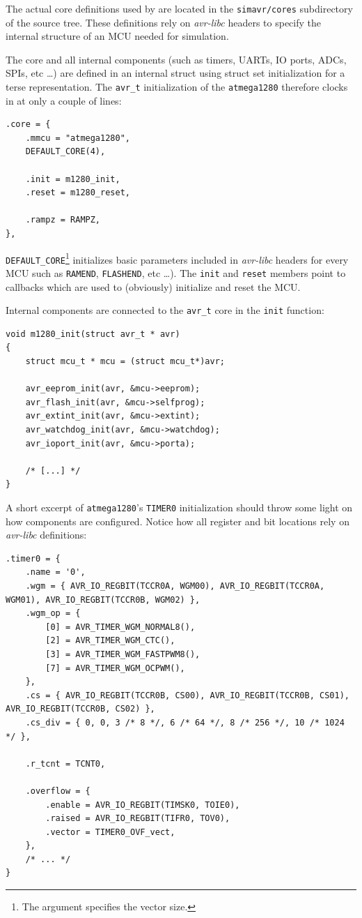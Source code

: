 The actual core definitions used by \simavr are located in the
\verb|simavr/cores| subdirectory of the source tree. These definitions rely on
\emph{avr-libc} headers to specify the internal structure of an \ac{MCU} needed
for simulation.

The core and all internal components (such as timers, \acp{UART}, \ac{IO} ports,
\acp{ADC}, \acp{SPI}, etc \ldots) are defined in an internal struct using struct
set initialization for a terse representation. The \lstinline|avr_t| initialization
of the \verb|atmega1280| therefore clocks in at only a couple of lines:

\begin{lstlisting}
.core = {
    .mmcu = "atmega1280",
    DEFAULT_CORE(4),

    .init = m1280_init,
    .reset = m1280_reset,

    .rampz = RAMPZ,
},
\end{lstlisting}

\lstinline|DEFAULT_CORE|\footnote{
%
The argument specifies the vector size.
%
} initializes basic parameters included in \emph{avr-libc}
headers for every \ac{MCU} such as \lstinline|RAMEND|, \lstinline|FLASHEND|,
etc \ldots). The \lstinline|init| and \lstinline|reset| members point to callbacks
which are used to (obviously) initialize and reset the \ac{MCU}.

Internal components are connected to the \lstinline|avr_t| core in the
\lstinline|init| function:

\begin{lstlisting}
void m1280_init(struct avr_t * avr)
{
    struct mcu_t * mcu = (struct mcu_t*)avr;

    avr_eeprom_init(avr, &mcu->eeprom);
    avr_flash_init(avr, &mcu->selfprog);
    avr_extint_init(avr, &mcu->extint);
    avr_watchdog_init(avr, &mcu->watchdog);
    avr_ioport_init(avr, &mcu->porta);

    /* [...] */
}
\end{lstlisting}

A short excerpt of \verb|atmega1280|'s \lstinline|TIMER0| initialization should
throw some light on how components are configured. Notice how all register and
bit locations rely on \emph{avr-libc} definitions:

\begin{lstlisting}
.timer0 = {
    .name = '0',
    .wgm = { AVR_IO_REGBIT(TCCR0A, WGM00), AVR_IO_REGBIT(TCCR0A, WGM01), AVR_IO_REGBIT(TCCR0B, WGM02) },
    .wgm_op = {
        [0] = AVR_TIMER_WGM_NORMAL8(),
        [2] = AVR_TIMER_WGM_CTC(),
        [3] = AVR_TIMER_WGM_FASTPWM8(),
        [7] = AVR_TIMER_WGM_OCPWM(),
    },
    .cs = { AVR_IO_REGBIT(TCCR0B, CS00), AVR_IO_REGBIT(TCCR0B, CS01), AVR_IO_REGBIT(TCCR0B, CS02) },
    .cs_div = { 0, 0, 3 /* 8 */, 6 /* 64 */, 8 /* 256 */, 10 /* 1024 */ },

    .r_tcnt = TCNT0,

    .overflow = {
        .enable = AVR_IO_REGBIT(TIMSK0, TOIE0),
        .raised = AVR_IO_REGBIT(TIFR0, TOV0),
        .vector = TIMER0_OVF_vect,
    },
    /* ... */
}
\end{lstlisting}

